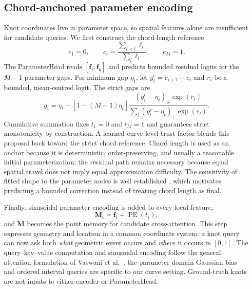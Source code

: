 \documentclass[preprint,12pt]{elsarticle}
\begin{document}
\subsection{Chord-anchored parameter encoding}
Knot coordinates live in parameter space, so spatial features alone are
insufficient for candidate queries. We first construct the chord-length
reference
\begin{equation}
c_1=0,\qquad
c_i=\frac{\sum_{l<i}\ell_l}{\sum_l\ell_l},\qquad c_M=1.
\end{equation}
The ParameterHead reads $[\bm f_i,\bm f_g]$ and predicts bounded residual
logits for the $M-1$ parameter gaps. For minimum gap $\eta_t$, let
$g_i^c=c_{i+1}-c_i$ and $r_i$ be a bounded, mean-centred logit. The strict
gaps are
\begin{equation}
g_i=\eta_t+
[1-(M-1)\eta_t]
\frac{(g_i^c-\eta_t)_+\exp(r_i)}
{\sum_l(g_l^c-\eta_t)_+\exp(r_l)}.
\label{eq:parameter-gaps}
\end{equation}
Cumulative summation fixes $t_1=0$ and $t_M=1$ and guarantees strict
monotonicity by construction. A learned curve-level trust factor blends this
proposal back toward the strict chord reference. Chord length is used as an
anchor because it is deterministic, order-preserving, and usually a reasonable
initial parameterization; the residual path remains necessary because equal
spatial travel does not imply equal approximation difficulty. The sensitivity
of fitted shape to the parameter nodes is well established
\cite{lee1989,scholz2021}, which motivates predicting a bounded correction
instead of treating chord length as final.

Finally, sinusoidal parameter encoding is added to every local feature,
\begin{equation}
\bm M_i=\bm f_i+\operatorname{PE}(t_i),
\end{equation}
and $\bm M$ becomes the point memory for candidate cross-attention. This step
expresses geometry and location in a common coordinate system: a knot query can
now ask both \emph{what} geometric event occurs and \emph{where} it occurs in
$[0,1]$. The query--key--value computation and sinusoidal encoding follow the
general attention formulation of Vaswani et al.~\cite{vaswani2017}; the
parameter-domain Gaussian bias and ordered interval queries are specific to
our curve setting. Ground-truth knots are not inputs to either encoder or
ParameterHead.
\end{document}
